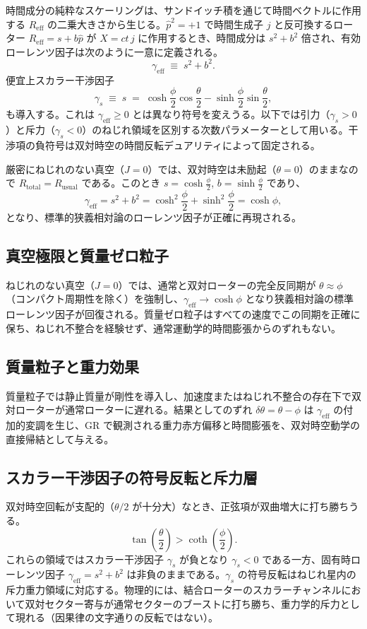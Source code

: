 \documentclass[dvipdfmx,a4paper]{article}
\begin{document}
時間成分の純粋なスケーリングは、サンドイッチ積を通じて時間ベクトルに作用する $R_\text{eff}$ の二乗大きさから生じる。$\hat{p}^2 = +1$ で時間生成子 $j$ と反可換するローター $R_\text{eff} = s + b\hat{p}$ が $X = ct\, j$ に作用するとき、時間成分は $s^2 + b^2$ 倍され、有効ローレンツ因子は次のように一意に定義される。
\[
\gamma_\text{eff} \;\equiv\; s^2 + b^2.
\]
便宜上スカラー干渉因子
\[
\gamma_s \;\equiv\; s \;=\; \cosh\frac{\phi}{2} \cos\frac{\theta}{2} - \sinh\frac{\phi}{2} \sin\frac{\theta}{2},
\]
も導入する。これは $\gamma_\text{eff}\geq 0$ とは異なり符号を変えうる。以下では引力（$\gamma_s > 0$）と斥力（$\gamma_s < 0$）のねじれ領域を区別する次数パラメーターとして用いる。干渉項の負符号は双対時空の時間反転デュアリティによって固定される。

厳密にねじれのない真空（$J=0$）では、双対時空は未励起（$\theta = 0$）のままなので $R_\text{total} = R_\text{usual}$ である。このとき $s = \cosh\frac{\phi}{2}$, $b = \sinh\frac{\phi}{2}$ であり、
\[
\gamma_\text{eff} = s^2 + b^2 = \cosh^2\frac{\phi}{2} + \sinh^2\frac{\phi}{2} = \cosh\phi,
\]
となり、標準的狭義相対論のローレンツ因子が正確に再現される。

\subsection{真空極限と質量ゼロ粒子}

ねじれのない真空（$J=0$）では、通常と双対ローターの完全反同期が $\theta \approx \phi$（コンパクト周期性を除く）を強制し、$\gamma_{\text{eff}} \to \cosh\phi$ となり狭義相対論の標準ローレンツ因子が回復される。質量ゼロ粒子はすべての速度でこの同期を正確に保ち、ねじれ不整合を経験せず、通常運動学的時間膨張からのずれもない。

\subsection{質量粒子と重力効果}

質量粒子では静止質量が剛性を導入し、加速度またはねじれ不整合の存在下で双対ローターが通常ローターに遅れる。結果としてのずれ $\delta\theta = \theta - \phi$ は $\gamma_{\text{eff}}$ の付加的変調を生じ、GR で観測される重力赤方偏移と時間膨張を、双対時空動学の直接帰結として与える。

\subsection{スカラー干渉因子の符号反転と斥力層}

双対時空回転が支配的（$\theta/2$ が十分大）なとき、正弦項が双曲増大に打ち勝ちうる。
\[
\tan\left(\frac{\theta}{2}\right) > \coth\left(\frac{\phi}{2}\right).
\]
これらの領域ではスカラー干渉因子 $\gamma_s$ が負となり $\gamma_s < 0$ である一方、固有時ローレンツ因子 $\gamma_\text{eff} = s^2 + b^2$ は非負のままである。$\gamma_s$ の符号反転はねじれ星内の斥力重力領域に対応する。物理的には、結合ローターのスカラーチャンネルにおいて双対セクター寄与が通常セクターのブーストに打ち勝ち、重力学的斥力として現れる（因果律の文字通りの反転ではない）。
\end{document}
